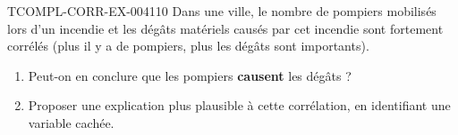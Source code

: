 \begin{exercice}{TCOMPL-CORR-EX-004}{1}{10}
Dans une ville, le nombre de pompiers mobilisés lors d'un incendie et les dégâts matériels causés par cet incendie sont fortement corrélés (plus il y a de pompiers, plus les dégâts sont importants).
\begin{enumerate}
  \item Peut-on en conclure que les pompiers \textbf{causent} les dégâts ?
  \item Proposer une explication plus plausible à cette corrélation, en identifiant une variable cachée.
\end{enumerate}
\end{exercice}

%
%
%
